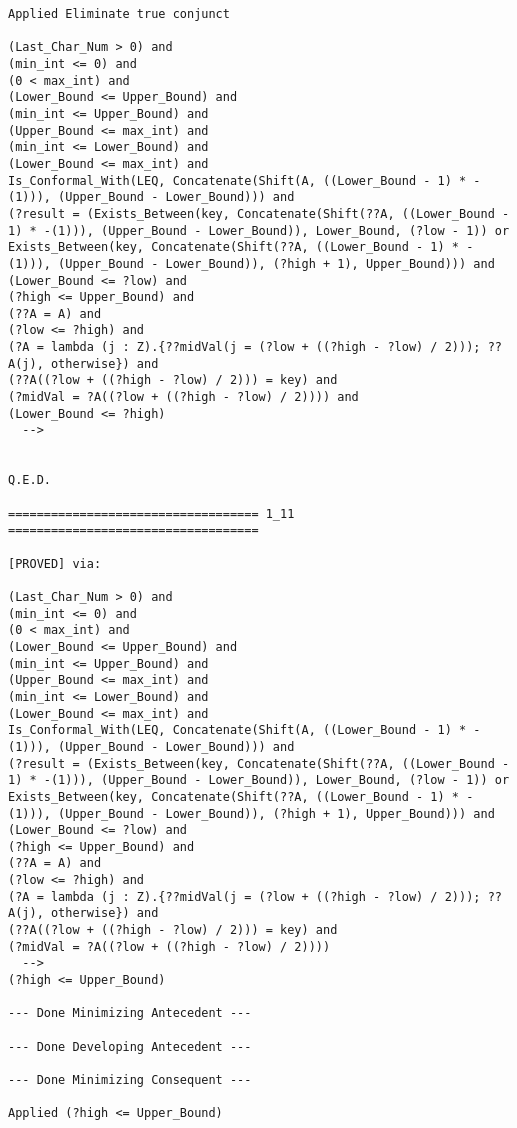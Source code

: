 \begin{lstlisting}[language=resolve]
Applied Eliminate true conjunct

(Last_Char_Num > 0) and
(min_int <= 0) and
(0 < max_int) and
(Lower_Bound <= Upper_Bound) and
(min_int <= Upper_Bound) and
(Upper_Bound <= max_int) and
(min_int <= Lower_Bound) and
(Lower_Bound <= max_int) and
Is_Conformal_With(LEQ, Concatenate(Shift(A, ((Lower_Bound - 1) * -(1))), (Upper_Bound - Lower_Bound))) and
(?result = (Exists_Between(key, Concatenate(Shift(??A, ((Lower_Bound - 1) * -(1))), (Upper_Bound - Lower_Bound)), Lower_Bound, (?low - 1)) or Exists_Between(key, Concatenate(Shift(??A, ((Lower_Bound - 1) * -(1))), (Upper_Bound - Lower_Bound)), (?high + 1), Upper_Bound))) and
(Lower_Bound <= ?low) and
(?high <= Upper_Bound) and
(??A = A) and
(?low <= ?high) and
(?A = lambda (j : Z).{??midVal(j = (?low + ((?high - ?low) / 2))); ??A(j), otherwise}) and
(??A((?low + ((?high - ?low) / 2))) = key) and
(?midVal = ?A((?low + ((?high - ?low) / 2)))) and
(Lower_Bound <= ?high)
  -->


Q.E.D.

=================================== 1_11 ===================================

[PROVED] via:

(Last_Char_Num > 0) and
(min_int <= 0) and
(0 < max_int) and
(Lower_Bound <= Upper_Bound) and
(min_int <= Upper_Bound) and
(Upper_Bound <= max_int) and
(min_int <= Lower_Bound) and
(Lower_Bound <= max_int) and
Is_Conformal_With(LEQ, Concatenate(Shift(A, ((Lower_Bound - 1) * -(1))), (Upper_Bound - Lower_Bound))) and
(?result = (Exists_Between(key, Concatenate(Shift(??A, ((Lower_Bound - 1) * -(1))), (Upper_Bound - Lower_Bound)), Lower_Bound, (?low - 1)) or Exists_Between(key, Concatenate(Shift(??A, ((Lower_Bound - 1) * -(1))), (Upper_Bound - Lower_Bound)), (?high + 1), Upper_Bound))) and
(Lower_Bound <= ?low) and
(?high <= Upper_Bound) and
(??A = A) and
(?low <= ?high) and
(?A = lambda (j : Z).{??midVal(j = (?low + ((?high - ?low) / 2))); ??A(j), otherwise}) and
(??A((?low + ((?high - ?low) / 2))) = key) and
(?midVal = ?A((?low + ((?high - ?low) / 2))))
  -->
(?high <= Upper_Bound)

--- Done Minimizing Antecedent ---

--- Done Developing Antecedent ---

--- Done Minimizing Consequent ---

Applied (?high <= Upper_Bound)


\end{lstlisting}
